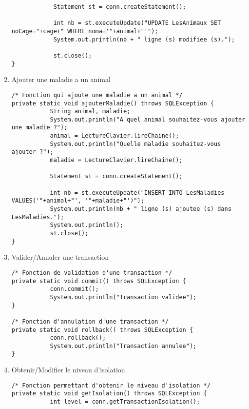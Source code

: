 \documentclass{article}
\begin{document}
\begin{enumerate}[label=\arabic*)]
\begin{lstlisting}
            Statement st = conn.createStatement();
            
            int nb = st.executeUpdate("UPDATE LesAnimaux SET noCage="+cage+" WHERE noma='"+animal+"'");         
            System.out.println(nb + " ligne (s) modifiee (s).");      
            
            st.close();
}	
	\end{lstlisting}	

	\item Ajouter une maladie a un animal

	\begin{lstlisting}
/* Fonction qui ajoute une maladie a un animal */
private static void ajouterMaladie() throws SQLException {
           String animal, maladie;
           System.out.println("A quel animal souhaitez-vous ajouter une maladie ?");
           animal = LectureClavier.lireChaine();
           System.out.println("Quelle maladie souhaitez-vous ajouter ?");
           maladie = LectureClavier.lireChaine();
            
           Statement st = conn.createStatement();

           int nb = st.executeUpdate("INSERT INTO LesMaladies VALUES('"+animal+"', '"+maladie+"')");
           System.out.println(nb + " ligne (s) ajoutee (s) dans LesMaladies.");
           System.out.println();
           st.close();
}
	\end{lstlisting}

	\item Valider/Annuler une transaction

	\begin{lstlisting}
/* Fonction de validation d'une transaction */
private static void commit() throws SQLException {
           conn.commit();
           System.out.println("Transaction validee");
}
				
/* Fonction d'annulation d'une transaction */
private static void rollback() throws SQLException {
           conn.rollback();
           System.out.println("Transaction annulee");
}
	\end{lstlisting}

	\item Obtenir/Modifier le niveau d'isolation

	\begin{lstlisting}
/* Fonction permettant d'obtenir le niveau d'isolation */
private static void getIsolation() throws SQLException {
           int level = conn.getTransactionIsolation();
            

\end{lstlisting}
\end{enumerate}
\end{document}
